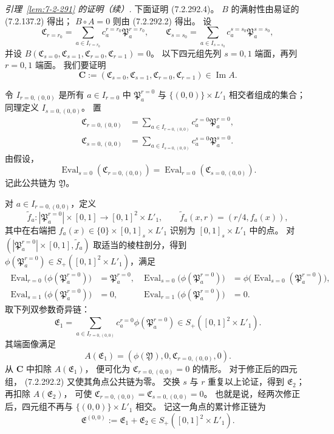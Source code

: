 
\par\noindent\textit{引理~\ref{lem:7-2-291} 的证明（续）.}\quad
下面证明 (7.2.292.4)。
$B$ 的满射性由易证的 (7.2.137.2) 得出；
$B\circ A=0$ 则由 (7.2.292.2) 得出。
设
\[
\mathfrak C_{r=r_0}
=\sum_{a\in I_{r=r_0}}c_a^{r=r_0}\mathfrak P_a^{r=r_0},
\qquad
\mathfrak C_{s=s_0}
=\sum_{a\in I_{s=s_0}}c_a^{s=s_0}\mathfrak P_a^{s=s_0},
\]
并设
$B(\mathfrak C_{s=0},\mathfrak C_{s=1},
\mathfrak C_{r=0},\mathfrak C_{r=1})=0$。
以下四元组先列 $s=0,1$ 端面，再列 $r=0,1$ 端面。
我们要证明
\[
\mathbf C:=(\mathfrak C_{s=0},\mathfrak C_{s=1},
\mathfrak C_{r=0},\mathfrak C_{r=1})\in\operatorname{Im}A.
\]

令 $I_{r=0,(0,0)}$ 是所有 $a\in I_{r=0}$ 中
$\mathfrak P_a^{r=0}$ 与
$\{(0,0)\}\times L'_1$ 相交者组成的集合；
同理定义 $I_{s=0,(0,0)}$。
置
\[
\begin{aligned}
\mathfrak C_{r=0,(0,0)}
&=\sum_{a\in I_{r=0,(0,0)}}
c_a^{r=0}\mathfrak P_a^{r=0},\\
\mathfrak C_{s=0,(0,0)}
&=\sum_{a\in I_{s=0,(0,0)}}
c_a^{s=0}\mathfrak P_a^{s=0}.
\end{aligned}
\]
由假设，
\[
\operatorname{Eval}_{s=0}(\mathfrak C_{r=0,(0,0)})
=\operatorname{Eval}_{r=0}(\mathfrak C_{s=0,(0,0)}).
\]
记此公共链为 $\mathfrak Y$。

对 $a\in I_{r=0,(0,0)}$，定义
\[
\widetilde f_a\colon
|\mathfrak P_a^{r=0}|\times[0,1]
\longrightarrow[0,1]^2\times L'_1,
\qquad
\widetilde f_a(x,r)=(r/4,f_a(x)),
\]
其中在右端把
$f_a(x)\in\{0\}\times[0,1]_s\times L'_1$
识别为 $[0,1]_s\times L'_1$ 中的点。
对 $(|\mathfrak P_a^{r=0}|\times[0,1],\widetilde f_a)$
取适当的棱柱剖分，得到
$\phi(\mathfrak P_a^{r=0})
\in S_+([0,1]^2\times L'_1)$，满足
\[
\begin{aligned}
\operatorname{Eval}_{r=0}
\bigl(\phi(\mathfrak P_a^{r=0})\bigr)
&=\mathfrak P_a^{r=0},&
\operatorname{Eval}_{s=0}
\bigl(\phi(\mathfrak P_a^{r=0})\bigr)
&=\phi\bigl(\operatorname{Eval}_{s=0}
(\mathfrak P_a^{r=0})\bigr),\\
\operatorname{Eval}_{s=1}
\bigl(\phi(\mathfrak P_a^{r=0})\bigr)
&=0,&
\operatorname{Eval}_{r=1}
\bigl(\phi(\mathfrak P_a^{r=0})\bigr)
&=0.
\end{aligned}
\]
取下列双参数奇异链：
\[
\mathfrak E_1=
\sum_{a\in I_{r=0,(0,0)}}
c_a^{r=0}\phi(\mathfrak P_a^{r=0})
\in S_+([0,1]^2\times L'_1).
\]
其端面像满足
\[
A(\mathfrak E_1)
=(\phi(\mathfrak Y),0,\mathfrak C_{r=0,(0,0)},0).
\]
从 $\mathbf C$ 中扣除 $A(\mathfrak E_1)$，
便可化为 $\mathfrak C_{r=0,(0,0)}=0$ 的情形。
对于修正后的四元组，
(7.2.292.2) 又使其角点公共链为零。
交换 $s$ 与 $r$ 重复以上论证，得到 $\mathfrak E_2$；
再扣除 $A(\mathfrak E_2)$，
可使 $\mathfrak C_{r=0,(0,0)}
=\mathfrak C_{s=0,(0,0)}=0$。
也就是说，经两次修正后，四元组不再与
$\{(0,0)\}\times L'_1$ 相交。
记这一角点的累计修正链为
\[
\mathfrak E^{(0,0)}
:=\mathfrak E_1+\mathfrak E_2
\in S_+([0,1]^2\times L'_1).
\]

